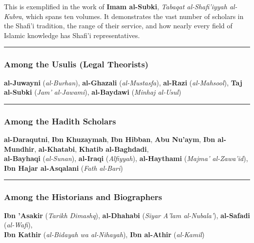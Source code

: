 \documentclass[
  a4paper,
  DIV=11,
  numbers=noendperiod]{scrartcl}
\begin{document}
This is exemplified in the work of \textbf{Imam al-Subki}, \emph{Tabaqat
al-Shafi'iyyah al-Kubra}, which spans ten volumes. It demonstrates the
vast number of scholars in the Shafi'i tradition, the range of their
service, and how nearly every field of Islamic knowledge has Shafi'i
representatives.

\begin{center}\rule{0.5\linewidth}{0.5pt}\end{center}

\subsubsection{Among the Usulis (Legal
Theorists)}\label{among-the-usulis-legal-theorists}

\textbf{al-Juwayni} (\emph{al-Burhan}), \textbf{al-Ghazali}
(\emph{al-Mustasfa}), \textbf{al-Razi} (\emph{al-Mahsool}), \textbf{Taj
al-Subki} (\emph{Jam' al-Jawami}), \textbf{al-Baydawi} (\emph{Minhaj
al-Usul})

\begin{center}\rule{0.5\linewidth}{0.5pt}\end{center}

\subsubsection{Among the Hadith
Scholars}\label{among-the-hadith-scholars}

\textbf{al-Daraqutni}, \textbf{Ibn Khuzaymah}, \textbf{Ibn Hibban},
\textbf{Abu Nu'aym}, \textbf{Ibn al-Mundhir}, \textbf{al-Khatabi},
\textbf{Khatib al-Baghdadi},\\
\textbf{al-Bayhaqi} (\emph{al-Sunan}), \textbf{al-Iraqi}
(\emph{Alfiyyah}), \textbf{al-Haythami} (\emph{Majma' al-Zawa'id}),
\textbf{Ibn Hajar al-Asqalani} (\emph{Fath al-Bari})

\begin{center}\rule{0.5\linewidth}{0.5pt}\end{center}

\subsubsection{Among the Historians and
Biographers}\label{among-the-historians-and-biographers}

\textbf{Ibn 'Asakir} (\emph{Tarikh Dimashq}), \textbf{al-Dhahabi}
(\emph{Siyar A'lam al-Nubala'}), \textbf{al-Safadi} (\emph{al-Wafi}),\\
\textbf{Ibn Kathir} (\emph{al-Bidayah wa al-Nihayah}), \textbf{Ibn
al-Athir} (\emph{al-Kamil})
\end{document}

